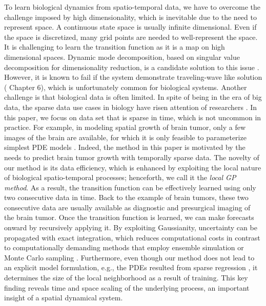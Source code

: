 \documentclass[smallextended,natbib]{svjour3}       %
\begin{document}
To learn biological dynamics from spatio-temporal data, we have to overcome the challenge imposed by high dimensionality, which is inevitable due to the need to represent space. A continuous state space is usually infinite dimensional. Even if the space is discretized, many grid points are needed to well-represent the space. It is challenging to learn the transition function as it is a map on high dimensional spaces. Dynamic mode decomposition, based on singular value decomposition for dimensionality reduction, is a candidate solution to this issue \citep{schmid2010dynamic}. However, it is known to fail if the system demonstrate traveling-wave like solution (\citep{Brunton2019} Chapter 6), which is unfortunately common for biological systems. Another challenge is that biological data is often limited. In spite of being in the era of big data, the sparse data use cases in biology have risen attention of researchers \citep{Lagergren2020}. In this paper, we focus on data set that is sparse in time, which is not uncommon in practice. For example, in modeling spatial growth of brain tumor, only a few images of the brain are available, for which it is only feasible to parameterize simplest PDE models \citep{Han2019b,lipkova2019personalized,McDaniel2013}. Indeed, the method in this paper is motivated by the needs to predict brain tumor growth with temporally sparse data. The novelty of our method is its data efficiency, which is enhanced by exploiting the local nature of biological spatio-temporal processes; henceforth, we call it the \emph{local GP method}. As a result, the transition function can be effectively learned using only two consecutive data in time. Back to the example of brain tumors, these two consecutive data are usually available as diagnostic and presurgical imaging of the brain tumor. Once the transition function is learned, we can make forecasts onward by recursively applying it. By exploiting Gaussianity, uncertainty can be propagated with exact integration, which reduces computational costs in contrast to computationally demanding methods that employ ensemble simulation or Monte Carlo sampling \citep{lipkova2019personalized,McDaniel2013}. Furthermore, even though our method does not lead to an explicit model formulation, e.g.,  the PDEs resulted from sparse regression \citep{brunton2016discovering} , it determines the size of the local neighborhood as a result of training. This key finding reveals time and space scaling of the underlying process, an important insight of a spatial dynamical system.  
               
\end{document}
